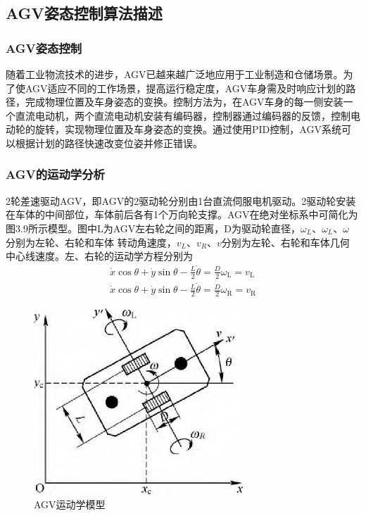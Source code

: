 \documentclass[cs4size,a4paper]{ctexart}
\numberwithin{equation}{section}
\numberwithin{table}{section}
\numberwithin{figure}{section}
\begin{document}
\subsection{AGV姿态控制算法描述}
\subsubsection{AGV姿态控制}
随着工业物流技术的进步，AGV已越来越广泛地应用于工业制造和仓储场景。为了使AGV适应不同的工作场景，提高运行稳定度，AGV车身需及时响应计划的路径，完成物理位置及车身姿态的变换。控制方法为，在AGV车身的每一侧安装一个直流电动机，两个直流电动机安装有编码器，控制器通过编码器的反馈，控制电动轮的旋转，实现物理位置及车身姿态的变换。通过使用PID控制，AGV系统可以根据计划的路径快速改变位姿并修正错误。
\subsubsection{AGV的运动学分析}
2轮差速驱动AGV，即AGV的2驱动轮分别由1台直流伺服电机驱动。2驱动轮安装在车体的中间部位，车体前后各有1个万向轮支撑。AGV在绝对坐标系中可简化为图3.9所示模型\cite{杨远航基于模糊控制的}。图中L为AGV左右轮之间的距离，D为驱动轮直径，$\omega_{L}$、$\omega_{L}$、$\omega$ 分别为左轮、右轮和车体 转动角速度，$v_{L}$、$v_{R}$、$v$分别为左轮、右轮和车体几何 中心线速度。左、右轮的运动学方程分别为
\begin{align}
        \dot{x} \cos \theta+\dot{y} \sin \theta-\frac{L}{2} \dot{\theta}=\frac{D}{2} \omega_{\mathrm{L}}=v_{\mathrm{L}}\\ \dot{x} \cos \theta+\dot{y} \sin \theta-\frac{L}{2} \dot{\theta}=\frac{D}{2} \omega_{\mathrm{R}}=v_{\mathrm{R}}
\end{align}
\begin{figure}[H]
    \centering
    \includegraphics[width=0.7\textwidth]{figure/AGVkinematics.jpg}
    \caption{AGV运动学模型}
\end{figure}
\end{document}
